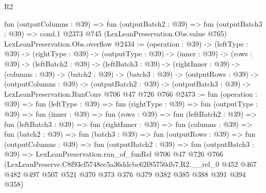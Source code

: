 \begin{lexlean}{R2}
\begin{coremodule}
  fun (outputColumns : @39) =>
  fun (outputBatch2 : @39) =>
  fun (outputBatch3 : @39) =>
  cond.{1} @2373 @745 (LexLeanPreservation.Obs.value @765) LexLeanPreservation.Obs.overflow
@2434 := (operation : @39) ->
  (leftType : @39) ->
  (rightType : @39) ->
  (outputType : @39) ->
  (inner : @39) ->
  (rows : @39) ->
  (leftBatch2 : @39) ->
  (leftBatch3 : @39) ->
  (rightInner : @39) ->
  (columns : @39) ->
  (batch2 : @39) ->
  (batch3 : @39) ->
  (outputRows : @39) ->
  (outputColumns : @39) ->
  (outputBatch2 : @39) -> (outputBatch3 : @39) -> LexLeanPreservation.RunConv @706 @47 @726 @766
@2473 := fun (operation : @39) =>
  fun (leftType : @39) =>
  fun (rightType : @39) =>
  fun (outputType : @39) =>
  fun (inner : @39) =>
  fun (rows : @39) =>
  fun (leftBatch2 : @39) =>
  fun (leftBatch3 : @39) =>
  fun (rightInner : @39) =>
  fun (columns : @39) =>
  fun (batch2 : @39) =>
  fun (batch3 : @39) =>
  fun (outputRows : @39) =>
  fun (outputColumns : @39) =>
  fun (outputBatch2 : @39) =>
  fun (outputBatch3 : @39) =>
  LexLeanPreservation.run_of_funRel
    @706
    @47
    @726
    @766
    (LexLeanPreserve.C8f93cf5748ec5a36ddcbc62f85750db7.R2.__rel_0
      @452
      @467
      @482
      @497
      @507
      @521
      @370
      @373
      @376
      @379
      @382
      @385
      @388
      @391
      @394
      @358)
\end{coremodule}
\end{lexlean}
